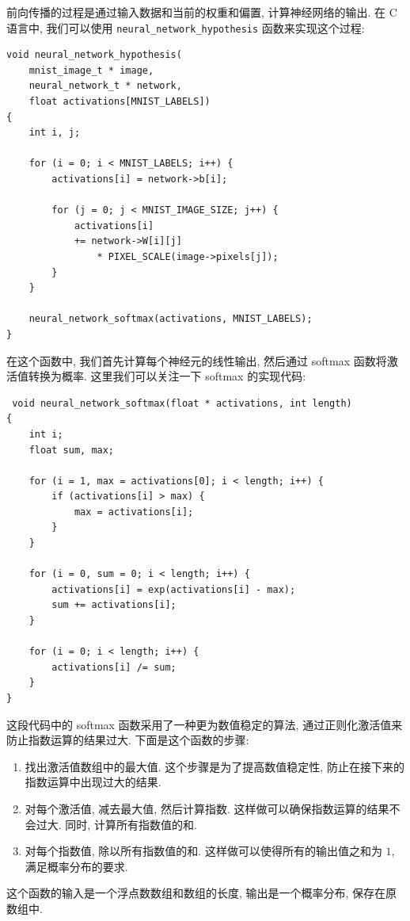 \documentclass{ctexart}
\begin{document}



前向传播的过程是通过输入数据和当前的权重和偏置, 计算神经网络的输出. 在 C 语言中, 我们可以使用 \verb|neural_network_hypothesis| 函数来实现这个过程:

\begin{verbatim}  
void neural_network_hypothesis(
    mnist_image_t * image, 
    neural_network_t * network, 
    float activations[MNIST_LABELS])  
{  
    int i, j;  
  
    for (i = 0; i < MNIST_LABELS; i++) {  
        activations[i] = network->b[i];  
  
        for (j = 0; j < MNIST_IMAGE_SIZE; j++) {  
            activations[i] 
            += network->W[i][j] 
                * PIXEL_SCALE(image->pixels[j]);  
        }  
    }  
  
    neural_network_softmax(activations, MNIST_LABELS);  
}  
\end{verbatim}

在这个函数中, 我们首先计算每个神经元的线性输出, 然后通过 softmax 函数将激活值转换为概率. 这里我们可以关注一下 softmax 的实现代码:

\begin{verbatim}
 void neural_network_softmax(float * activations, int length)
{
    int i;
    float sum, max;

    for (i = 1, max = activations[0]; i < length; i++) {
        if (activations[i] > max) {
            max = activations[i];
        }
    }

    for (i = 0, sum = 0; i < length; i++) {
        activations[i] = exp(activations[i] - max);
        sum += activations[i];
    }

    for (i = 0; i < length; i++) {
        activations[i] /= sum;
    }
}
\end{verbatim}

这段代码中的 softmax 函数采用了一种更为数值稳定的算法, 通过正则化激活值来防止指数运算的结果过大. 下面是这个函数的步骤:
\begin{enumerate}
    \item 找出激活值数组中的最大值. 这个步骤是为了提高数值稳定性, 防止在接下来的指数运算中出现过大的结果.
    \item 对每个激活值, 减去最大值, 然后计算指数. 这样做可以确保指数运算的结果不会过大. 同时, 计算所有指数值的和.
    \item 对每个指数值, 除以所有指数值的和. 这样做可以使得所有的输出值之和为 $1$, 满足概率分布的要求.
\end{enumerate}
这个函数的输入是一个浮点数数组和数组的长度, 输出是一个概率分布, 保存在原数组中.
\end{document}
